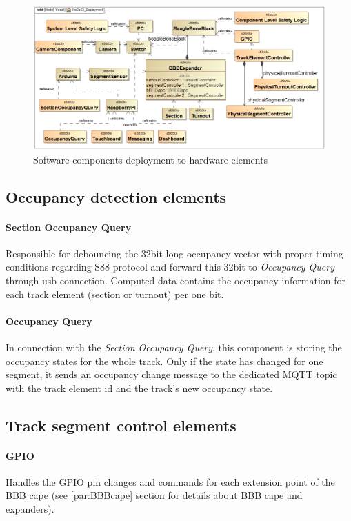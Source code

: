 \begin{figure}[ht]
	\centering
	\includegraphics[width=150mm]{figures/modes3/MoDeS3_Deployment.png}
	\caption{Software components deployment to hardware elements}
	\label{fig:Modes3Deployment}
\end{figure}

\subsection{Occupancy detection elements} \label{section:OccupancyDetection}
\paragraph{Section Occupancy Query}
Responsible for debouncing the 32bit long occupancy vector with proper timing conditions regarding S88 protocol and forward this 32bit to \textit{Occupancy Query} through usb connection. Computed data contains the occupancy information for each track element (section or turnout) per one bit.
\paragraph{Occupancy Query}
In connection with the \textit{Section Occupancy Query}, this component is storing the occupancy states for the whole track. Only if the state has changed for one segment, it sends an occupancy change message to the dedicated MQTT topic with the track element id and the track's new occupancy state.

\subsection{Track segment control elements}
\paragraph{GPIO}
Handles the GPIO pin changes and commands for each extension point of the BBB cape (see \ref{par:BBBcape} section for details about BBB cape and expanders).
